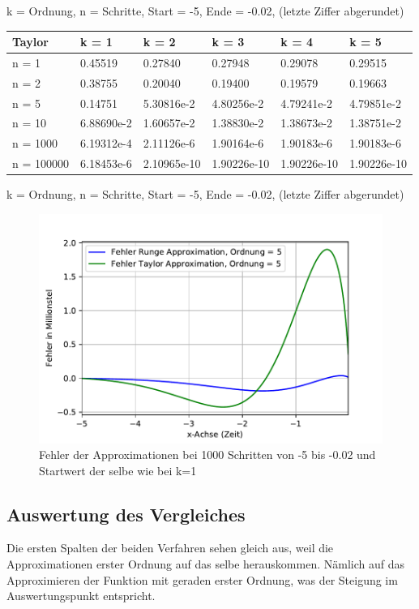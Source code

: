 k = Ordnung, n = Schritte, Start = -5, Ende = -0.02, (letzte Ziffer abgerundet)

\begin{tabular}[h]{|l|l|l|l|l|l|}
	\hline
	Taylor & k = 1 & k = 2 & k = 3 & k = 4 & k = 5\\
	\hline
	n = 1 & 0.45519 & 0.27840 & 0.27948 & 0.29078 & 0.29515\\
	\hline
	n = 2 & 0.38755 & 0.20040 & 0.19400 & 0.19579 & 0.19663\\
	\hline
	n = 5 & 0.14751 & 5.30816e-2 & 4.80256e-2 & 4.79241e-2 & 4.79851e-2\\
	\hline
	n = 10 & 6.88690e-2 & 1.60657e-2 & 1.38830e-2 & 1.38673e-2 & 1.38751e-2\\
	\hline
	n = 1000 & 6.19312e-4 & 2.11126e-6 & 1.90164e-6 & 1.90183e-6 & 1.90183e-6\\
	\hline
	n = 100000 & 6.18453e-6 & 2.10965e-10 & 1.90226e-10 & 1.90226e-10 & 1.90226e-10\\
	\hline
\end{tabular}

k = Ordnung, n = Schritte, Start = -5, Ende = -0.02, (letzte Ziffer abgerundet)

\begin{figure}[h]
	\centering
	\includegraphics[width=12cm]{papers/taylor/taylorPictures/FehlerRungeUndTaylor.pdf}
	\caption{Fehler der Approximationen bei 1000 Schritten von -5 bis -0.02 und Startwert der selbe wie bei k=1}
	\label{taylor:section:fig:FehlerRungeTaylor}
\end{figure}

\subsection{Auswertung des Vergleiches}
\label{taylor:subsection:Auswertung}
Die ersten Spalten der beiden Verfahren sehen gleich aus, weil die Approximationen erster Ordnung auf das selbe herauskommen.
Nämlich auf das Approximieren der Funktion mit geraden erster Ordnung, was der Steigung im Auswertungspunkt entspricht.

